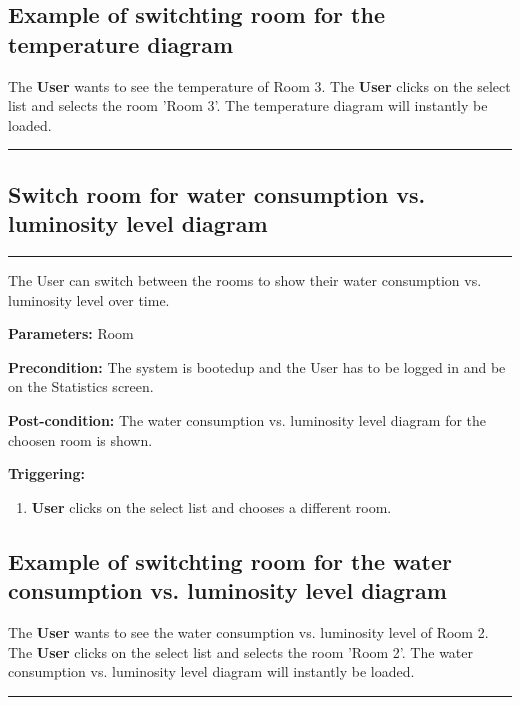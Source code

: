 \subsection{Example of switchting room for the temperature diagram}
The \textbf{User} wants to see the temperature of Room 3. The \textbf{User} clicks on the select list and selects the room 'Room 3'. The temperature diagram will instantly be loaded.
\hfill
\vspace{0.5cm}
\hrule




\subsection{Switch room for water consumption vs. luminosity level diagram}
\hrule
\hfill
\vspace{0.5cm}
\label{operation:Switch room for water consumption vs. luminosity level diagram}

The User can switch between the rooms to show their water consumption vs. luminosity level over time.

\begin{description}

\item \textbf{Parameters:} Room
\item \textbf{Precondition:} The system is bootedup and the User has to be
logged in and be on the Statistics screen.
\item \textbf{Post-condition:} The water consumption vs. luminosity level diagram for the choosen room is shown.
\item \textbf{Triggering:}
\begin{enumerate}

\item \textbf{User} clicks on the select list and chooses a different room.

\end{enumerate}
\end{description}

\subsection{Example of switchting room for the water consumption vs.
luminosity level diagram} The \textbf{User} wants to see the water consumption vs. luminosity level of Room 2. The \textbf{User} clicks on the select list and selects the room 'Room 2'. 
The water consumption vs. luminosity level diagram will instantly be loaded.
\hfill
\vspace{0.5cm}
\hrule

